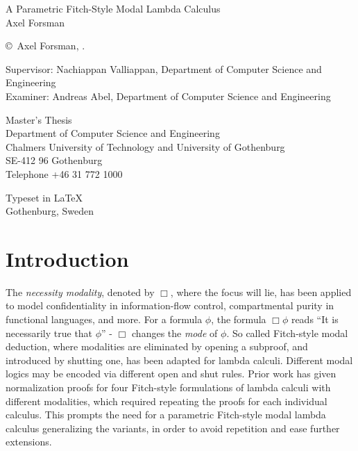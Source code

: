 \documentclass[12pt,twoside,openright]{report}
\numberwithin{equation}{chapter}
\numberwithin{figure}{chapter}
\numberwithin{table}{chapter}
\theoremstyle{definition}\newtheorem{definition}{Definition}
\newcommand{\oneLineTitle}{A Parametric Fitch-Style Modal Lambda Calculus}
\begin{document}
{
\newpage
\thispagestyle{plain}
\setlength{\parskip}{1cm}
\vspace*{4.5cm}
\oneLineTitle \\
Axel Forsman

\copyright~Axel Forsman, \the\year.

Supervisor: Nachiappan Valliappan, Department of Computer Science and Engineering \\
Examiner: Andreas Abel, Department of Computer Science and Engineering

Master's Thesis \the\year \\
Department of Computer Science and Engineering \\
Chalmers University of Technology and University of Gothenburg \\
SE-412 96 Gothenburg \\
Telephone +46 31 772 1000

\vfill

Typeset in \LaTeX \\
Gothenburg, Sweden \the\year
}

\newpage
\tableofcontents

\cleardoublepage
{}
{}
\listoffigures

\cleardoublepage
\setcounter{page}{1}

\chapter{Introduction}

The \emph{necessity modality}, denoted by $\Box$, where the focus will lie,
has been applied to model confidentiality in information-flow control,
compartmental purity in functional languages,
and more.
For a formula $\phi$, the formula $\Box \phi$ reads
``It is necessarily true that $\phi$'' -
$\Box$ changes the \emph{mode} of $\phi$.
So called Fitch-style modal deduction,
where modalities are eliminated by opening a subproof,
and introduced by shutting one,
has been adapted for lambda calculi.
Different modal logics may be encoded via different open and shut rules.
Prior work \cite{valliappan22} has given normalization proofs
for four Fitch-style formulations of lambda calculi with different modalities,
which required repeating the proofs for each individual calculus.
This prompts the need for a parametric Fitch-style modal lambda calculus
generalizing the variants,
in order to avoid repetition and ease further extensions.
\end{document}
